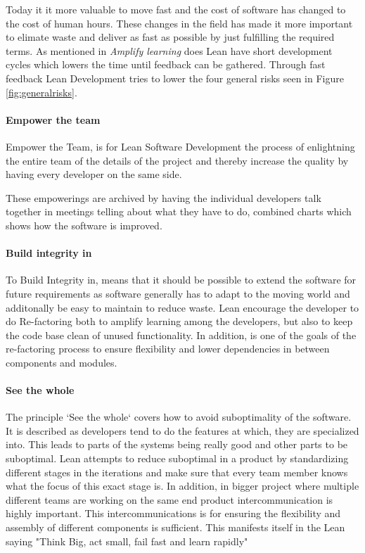 \documentclass{sig-alternate}
\begin{document}
Today it it more valuable to move fast and the cost of software has changed to the cost of human hours. 
These changes in the field has made it more important to elimate waste and deliver as fast as possible 
by just fulfilling the required terms.
As mentioned in \textit{Amplify learning} does Lean have short  development cycles which lowers the time until feedback can be gathered. Through fast feedback Lean Development tries to lower the four general risks seen in Figure \ref{fig:generalrisks}.

\paragraph{Empower the team}
Empower the Team, is for Lean Software Development the process of enlightning the entire team of the 
details of the project and thereby increase the quality by having every developer on the same side. 

These empowerings are archived by having the individual developers talk together in meetings telling
about what they have to do, combined charts which shows how the software is improved.

\paragraph{Build integrity in}
To Build Integrity in, means that it should be possible to extend the software for future requirements 
as software generally has to adapt to the moving world and additonally be easy to maintain to reduce waste.
Lean encourage the developer to do Re-factoring both to amplify learning among the developers, but also to keep the code base clean of unused functionality. In addition, is one of the goals of the re-factoring process to ensure flexibility and lower dependencies in between components and modules.  


\paragraph{See the whole}
The principle `See the whole` covers how to avoid suboptimality of the software. 
It is described as developers tend to do the features at which, they are specialized into.
This leads to parts of the systems being really good and other parts to be suboptimal.
Lean attempts to reduce suboptimal in a product by standardizing different stages in the iterations and make sure that every team member knows what the focus of this exact stage is. In addition, in bigger project where multiple different teams are working on the same end product intercommunication is highly important. This intercommunications is for ensuring the flexibility and assembly of different components is sufficient. This manifests itself in the Lean saying "Think Big, act small, fail fast and learn rapidly" \cite{poppendieck:lean} 
\end{document}
